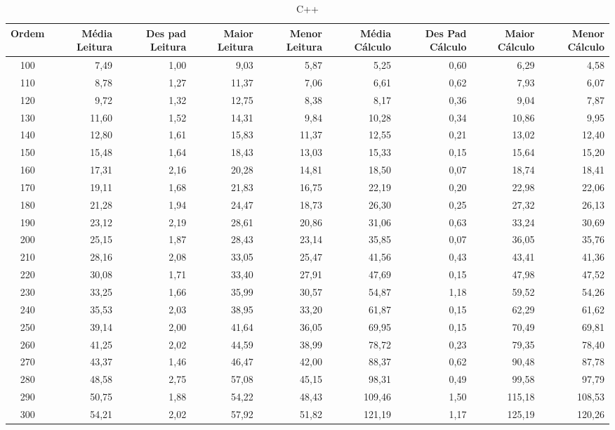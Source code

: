 \begin{landscape}
	\begin{table}[ht]
	\centering
	\begin{tabular}{| c | r | r | r | r | r | r | r | r | }
\hline
Ordem&Média Leitura&Des pad Leitura&Maior Leitura&Menor Leitura&Média Cálculo&Des Pad Cálculo&Maior Cálculo&Menor Cálculo\\ \hline 
		100&7,49&1,00&9,03&5,87&5,25&0,60&6,29&4,58\\
		110&8,78&1,27&11,37&7,06&6,61&0,62&7,93&6,07\\
		120&9,72&1,32&12,75&8,38&8,17&0,36&9,04&7,87\\
		130&11,60&1,52&14,31&9,84&10,28&0,34&10,86&9,95\\
		140&12,80&1,61&15,83&11,37&12,55&0,21&13,02&12,40\\
		150&15,48&1,64&18,43&13,03&15,33&0,15&15,64&15,20\\
		160&17,31&2,16&20,28&14,81&18,50&0,07&18,74&18,41\\
		170&19,11&1,68&21,83&16,75&22,19&0,20&22,98&22,06\\
		180&21,28&1,94&24,47&18,73&26,30&0,25&27,32&26,13\\
		190&23,12&2,19&28,61&20,86&31,06&0,63&33,24&30,69\\
		200&25,15&1,87&28,43&23,14&35,85&0,07&36,05&35,76\\
		210&28,16&2,08&33,05&25,47&41,56&0,43&43,41&41,36\\
		220&30,08&1,71&33,40&27,91&47,69&0,15&47,98&47,52\\
		230&33,25&1,66&35,99&30,57&54,87&1,18&59,52&54,26\\
		240&35,53&2,03&38,95&33,20&61,87&0,15&62,29&61,62\\
		250&39,14&2,00&41,64&36,05&69,95&0,15&70,49&69,81\\
		260&41,25&2,02&44,59&38,99&78,72&0,23&79,35&78,40\\
		270&43,37&1,46&46,47&42,00&88,37&0,62&90,48&87,78\\
		280&48,58&2,75&57,08&45,15&98,31&0,49&99,58&97,79\\
		290&50,75&1,88&54,22&48,43&109,46&1,50&115,18&108,53\\
		300&54,21&2,02&57,92&51,82&121,19&1,17&125,19&120,26\\
\hline
	\end{tabular}
	\caption{C++}
	\label{tabela_cpp}
	\end{table}
\end{landscape}
